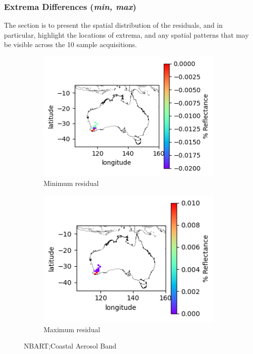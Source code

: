 \documentclass[a4paper]{article}
\begin{document}
  \clearpage

    \subsubsection{Extrema Differences (\textit{min, max})}

      \begin{flushleft}
        The section is to present the spatial distribution of the residuals, and in particular, highlight the locations of extrema, and any spatial patterns that may be visible across the 10 sample acquisitions. \par
      \end{flushleft}

      \begin{figure}[h!]
        \centering
          \begin{subfigure}[l]{.4\linewidth}
            \hspace{-32mm}
            \includegraphics[scale=0.9]{plots/nbart/nbart_coastal_aerosol-MinResidual.png}
            \caption{Minimum residual}
          \end{subfigure}
%
          \begin{subfigure}[r]{.4\linewidth}
            \includegraphics[scale=0.9]{plots/nbart/nbart_coastal_aerosol-MaxResidual.png}
            \caption{Maximum residual}
          \end{subfigure}
        \caption{NBART;\@ Coastal Aerosol Band}\label{figure:1}
      \end{figure}
\end{document}
